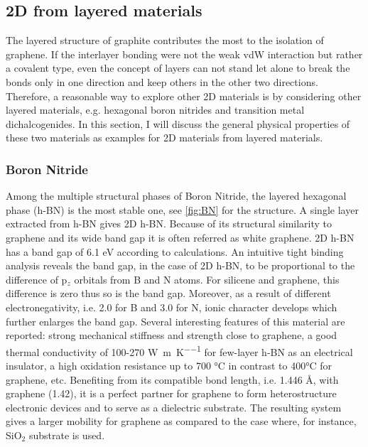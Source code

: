 \subsection{2D from layered materials}

The layered structure of graphite contributes the most to the isolation of graphene. If the interlayer bonding were not the weak vdW interaction but rather a covalent type, even the concept of layers can not stand let alone to break the bonds only in one direction and keep others in the other two directions. Therefore, a reasonable way to explore other 2D materials is by considering other layered materials, e.g. hexagonal boron nitrides and transition metal dichalcogenides. In this section, I will discuss the general physical properties of these two materials as examples for 2D materials from layered materials.

\subsubsection{Boron Nitride}

Among the multiple structural phases of Boron Nitride, the layered hexagonal phase (h-BN) is the most stable one, see \autoref{fig:BN} for the structure. A single layer extracted from h-BN gives 2D h-BN. Because of its structural similarity to graphene and its wide band gap it is often referred as white graphene\cite{alem2009atomically}. 2D h-BN has a band gap of 6.1 eV according to calculations. An intuitive tight binding analysis reveals the band gap, in the case of 2D h-BN, to be proportional to the difference of p$_z$ orbitals from B and N atoms. For silicene and graphene, this difference is zero thus so is the band gap. Moreover, as a result of different electronegativity, i.e. 2.0 for B and 3.0 for N, ionic character develops which further enlarges the band gap\cite{zhuang2012}. Several interesting features of this material are reported: strong mechanical stiffness and strength close to graphene\cite{Bosak2006}, a good thermal conductivity of 100-270 \si{\watt\per\meter\per\kelvin} for few-layer h-BN\cite{Jo2013} as an electrical insulator, a high oxidation resistance up to 700 \si{\celsius} in contrast to 400\si{\celsius} for graphene\cite{li2016atomically}, etc. Benefiting from its compatible bond length, i.e. 1.446 \AA, with graphene (1.42), it is a perfect partner for graphene to form heterostructure electronic devices  and to serve as a dielectric substrate\cite{Lee2013}. The resulting system gives a larger mobility for graphene as compared to the case where, for instance, SiO$_2$ substrate\cite{dean2010boron} is used. 



